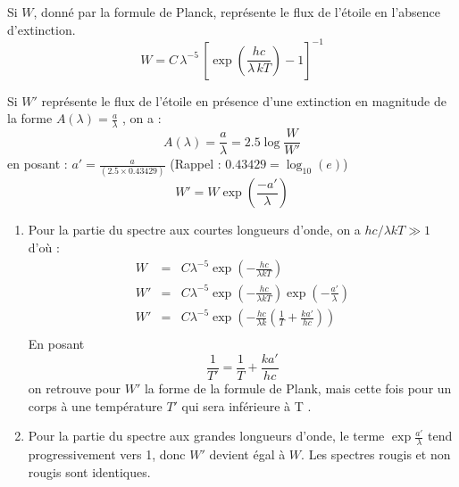 \documentclass[a4paper,10pt]{report}
\begin{document}
\begin{Answer}
  Si $W$, donné par la formule de Planck, représente le flux de
  l'étoile en l'absence d'extinction.
  $$
  W =
  C\,\lambda^{-5}\,\left[\exp\left({\frac{hc}{\lambda\,kT}}\right)-1\right]^{-1}
  $$

  Si $W'$ représente le flux de l'étoile en présence d'une extinction en
  magnitude de la forme $A(\lambda) = \frac{a}{\lambda}$ , on a :
  $$
  A(\lambda)= \frac{a}{\lambda} = 2.5 \log\frac{W}{W'}
  $$
  en posant : $a' = \frac{a}{(2.5 \times0.43429)}$ (Rappel : $0.43429 =
  \log_{10}(e)$)
  $$
  W' = W \exp\left(\frac{-a'}{\lambda}\right)
  $$

  \begin{enumerate}
  \item Pour la partie du spectre aux courtes longueurs d'onde, on a
    $hc/\lambda kT \gg 1$ d'où :
    \begin{eqnarray*}
      W  &=& C\lambda^{-5}\exp\left(-\frac{hc}{\lambda kT}\right) \\
      W' &=& C\lambda^{-5}\exp\left(-\frac{hc}{\lambda
          kT}\right)\exp\left(-\frac{a'}{\lambda}\right) \\
      W' &=& C\lambda^{-5}\exp\left(-\frac{hc}{\lambda
          k}\left(\frac{1}{T}+\frac{ka'}{hc}\right)\right) \\
    \end{eqnarray*}
    En posant
    $$
    \frac{1}{T'} = \frac{1}{T} + \frac{ka'}{hc}
    $$
    on retrouve pour $W'$ la forme de la formule de Plank, mais cette
    fois pour un corps à une température $T'$ qui sera inférieure à T .

  \item Pour la partie du spectre aux grandes longueurs d'onde, le
    terme $\exp\frac{a'}{\lambda}$ tend progressivement vers 1, donc
    $W'$ devient égal à $W$. Les spectres rougis et non rougis sont
    identiques.
  \end{enumerate}
\end{Answer}
\end{document}
